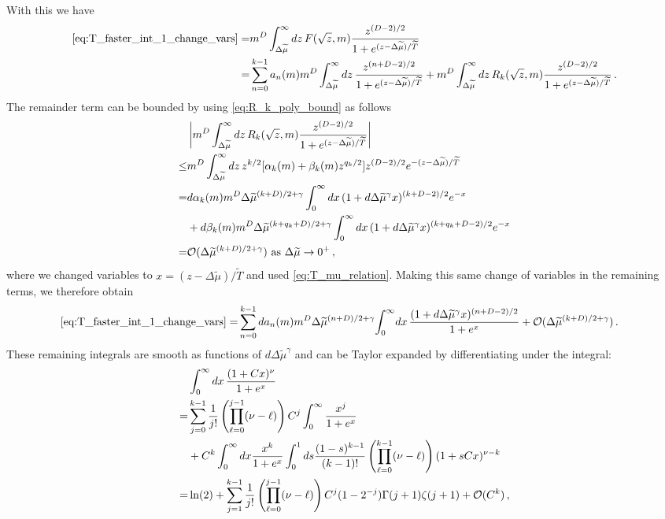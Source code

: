 \documentclass[sn-mathphys,Numbered]{sn-jnl}
\begin{document}
With this we have
\begin{align}
\eqref{eq:T_faster_int_1_change_vars} =&m^{D}\int_{\Delta\widetilde{\mu}}^\infty dz\, F(\sqrt{z},m)    \frac{z^{(D-2)/2}}{1+e^{(z-\Delta\widetilde{\mu})/\widetilde{T}}} \\
=& \sum_{n=0}^{k-1} a_n(m)m^{D}\int_{\Delta\widetilde{\mu}}^\infty dz\, \frac{z^{(n+D-2)/2}}{1+e^{(z-\Delta\widetilde{\mu})/\widetilde{T}}}+m^{D}\int_{\Delta\widetilde{\mu}}^\infty dz\,R_k(\sqrt{z},m)\frac{z^{(D-2)/2}}{1+e^{(z-\Delta\widetilde{\mu})/\widetilde{T}}}\,.\notag
\end{align}
The remainder term can be bounded by using \eqref{eq:R_k_poly_bound} as follows
\begin{align}
   &\left|m^{D}\int_{\Delta\widetilde{\mu}}^\infty dz\,R_k(\sqrt{z},m)\frac{z^{(D-2)/2}}{1+e^{(z-\Delta\widetilde{\mu})/\widetilde{T}}}\right|\\
   \leq&m^{D}\int_{\Delta\widetilde{\mu}}^\infty dz\,z^{k/2}[\alpha_k(m)+\beta_k(m)z^{q_k/2}]z^{(D-2)/2}e^{-(z-\Delta\widetilde{\mu})/\widetilde{T}}\notag\\
=&d\alpha_k(m)m^{D}\Delta\widetilde{\mu}^{(k+D)/2+\gamma}\int_{0}^\infty dx\,(1+d\Delta\widetilde{\mu}^{\gamma}x)^{(k+D-2)/2}e^{-x}\notag\\
&+d\beta_k(m)m^{D}\Delta\widetilde{\mu}^{(k+q_k+D)/2+\gamma}\int_{0}^\infty dx\,(1+d\Delta\widetilde{\mu}^{\gamma}x)^{(k+q_k+D-2)/2}e^{-x}\notag\\   
=&\mathcal{O}(\Delta\widetilde{\mu}^{(k+D)/2+\gamma})\text{ as } \Delta\widetilde{\mu}\to 0^+\,,\label{eq:T_faster_remainder_bound}
\end{align}
where we changed variables to $x=(z-\Delta\widetilde{\mu})/\widetilde{T}$ and used \eqref{eq:T_mu_relation}.  Making this same change of variables in the remaining terms, we  therefore obtain
\begin{align}\label{eq:T_faster_int_1_change_vars_expanded1}
\eqref{eq:T_faster_int_1_change_vars} =& \sum_{n=0}^{k-1} da_n(m)m^{D}\Delta\widetilde{\mu}^{(n+D)/2+\gamma}\!\int_{0}^\infty\! dx\, \frac{(1+d\Delta\widetilde{\mu}^{\gamma}x)^{(n+D-2)/2}}{1+e^{x}}+\mathcal{O}(\Delta\widetilde{\mu}^{(k+D)/2+\gamma})\,.
\end{align}
These remaining integrals are smooth as functions of $d\Delta\widetilde{\mu}^\gamma$ and can be Taylor expanded by differentiating under the integral:
\begin{align}\label{eq:aux_int_expansion1}
&\int_0^\infty dx\, \frac{(1+C x)^\nu}{1+e^x}\\
=&\sum_{j=0}^{k-1}\frac{1}{j!} \left(\prod_{\ell=0}^{j-1}(\nu-\ell) \right)C^j\int_0^\infty \frac{x^j}{1+e^x} \notag\\
&+C^k\int_0^\infty dx \frac{x^k}{1+e^x} \int_0^1 ds\frac{(1-s)^{k-1}}{(k-1)!}  \left(\prod_{\ell=0}^{k-1}(\nu-\ell)\right)(1+sCx)^{\nu-k}\notag\\
=&\ln(2)+\sum_{j=1}^{k-1}\frac{1}{j!} \left(\prod_{\ell=0}^{j-1}(\nu-\ell) \right)C^j  (1 - 2^{-j}) \Gamma(j+1) \zeta(j+1) +\mathcal{O}(C^k)\,, \notag
\end{align}
\end{document}
